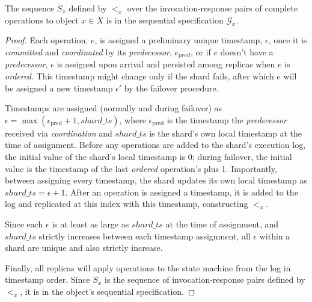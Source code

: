 \begin{lem}
    \label{lemmaD8}
    The sequence $S_x$ defined by $<_x$ over the invocation-response pairs of complete operations to object $x \in X$ is in the sequential specification $\mathcal{G}_x$.
\end{lem}
\begin{proof}
    Each operation, $e$, is assigned a preliminary unique timestamp, $\epsilon$, once it is \textit{committed} and \textit{coordinated} by its \textit{predecessor}, $e_{pred}$, or if $e$ doesn't have a \textit{predecessor}, $\epsilon$ is assigned upon arrival and persisted among replicas when $e$ is \textit{ordered}. This timestamp might change only if the shard fails, after which $e$ will be assigned a new timestamp $\epsilon'$ by the failover procedure.
    
    Timestamps are assigned (normally and during failover) as $\epsilon = \max(\epsilon_\text{pred}+1, shard\_ts)$, where $\epsilon_\text{pred}$ is the timestamp the \textit{predecessor} received via \textit{coordination} and $shard\_ts$ is the shard's own local timestamp at the time of assignment. Before any operations are added to the shard's execution log, the initial value of the shard's local timestamp is $0$; during failover, the initial value is the timestamp of the last \textit{ordered} operation's plus 1. Importantly, between assigning every timestamp, the shard updates its own local timestamp as $shard\_ts = \epsilon + 1$. After an operation is assigned a timestamp, it is added to the log and replicated at this index with this timestamp, constructing $<_x$.

    Since each $\epsilon$ is at least as large as $shard\_ts$ at the time of assignment, and $shard\_ts$ strictly increases between each timestamp assignment, all $\epsilon$ within a shard are unique and also strictly increase.

    Finally, all replicas will apply operations to the state machine from the log in timestamp order. Since $S_x$ is the sequence of invocation-response pairs defined by $<_x$, it is in the object's sequential specification.
\end{proof}



